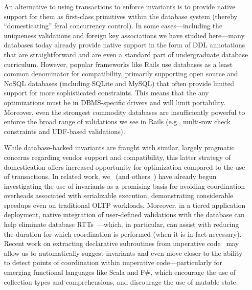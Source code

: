 An alternative to using transactions to enforce invariants is to
provide native support for them as first-class primitives within the
database system (thereby ``domesticating'' feral concurrency
control). In some cases---including the uniqueness validations and
foreign key associations we have studied here---many databases today
already provide native support in the form of DDL annotations that are
straightforward and are even a standard part of undergraduate database
curriculum. However, popular frameworks like Rails use databases as a
least common denominator for compatibility, primarily supporting open
source and NoSQL databases (including SQLite and MySQL) that often
provide limited support for more sophisticated constraints. This means
that the any optimizations must be in DBMS-specific drivers and will
limit portability. Moreover, even the strongest commodity databases
are insufficiently powerful to enforce the broad range of validations
we see in Rails (e.g., multi-row check constraints and UDF-based
validations).

While database-backed invariants are fraught with similar, largely
pragmatic concerns regarding vendor support and compatibility, this
latter strategy of domestication offers increased opportunity for
optimization compared to the use of transactions. In related work,
we~\cite{coord-avoid} (and others~\cite{redblue-new}) have already
begun investigating the use of invariants as a promising basis for
avoiding coordination overheads associated with serializable
execution, demonstrating considerable speedups even on traditional
OLTP workloads. Moreover, in a tiered application deployment, native
integration of user-defined validations with the database can help
eliminate database RTTs~\cite{pyxis}---which, in particular, can
assist with reducing the duration for which coordination is performed
(when it is in fact necessary). Recent work on extracting declarative
subroutines from imperative code~\cite{statusquo,writes-forest} may
allow us to automatically suggest invariants and even move closer to
the ability to detect points of coordination within imperative
code---particularly for emerging functional languages like Scala and
F\#, which encourage the use of collection types and comprehensions,
and discourage the use of mutable state.

